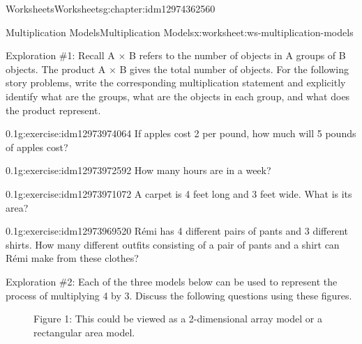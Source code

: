 \documentclass[twoside,11pt,]{book}
\begin{document}
\begin{chapterptx}{Worksheets}{}{Worksheets}{}{}{g:chapter:idm12974362560}
%
\begin{worksheet-section-numberless}{Multiplication Models}{}{Multiplication Models}{}{}{x:worksheet:ws-multiplication-models}
\begin{introduction}{}%
Exploration \#1: Recall A \(\times \) B refers to the number of objects in A groups of B objects.  The product A \(\times \) B gives the total number of objects.  For the following story problems, write the corresponding multiplication statement and explicitly identify what are the groups, what are the objects in each group, and what does the product represent.%
\end{introduction}%
\begin{divisionexercise}{1}{}{0.1}{g:exercise:idm12973974064}%
If apples cost \textdollar{}2 per pound, how much will 5 pounds of apples cost?%
\end{divisionexercise}%
\begin{divisionexercise}{2}{}{0.1}{g:exercise:idm12973972592}%
How many hours are in a week?%
\end{divisionexercise}%
\begin{divisionexercise}{3}{}{0.1}{g:exercise:idm12973971072}%
A carpet is 4 feet long and 3 feet wide. What is its area?%
\end{divisionexercise}%
\begin{divisionexercise}{4}{}{0.1}{g:exercise:idm12973969520}%
Rémi has 4 different pairs of pants and 3 different shirts. How many different outfits consisting of a pair of pants and a shirt can Rémi make from these clothes?%
\end{divisionexercise}%
\clearpage
\begin{introduction}{}%
Exploration \#2: Each of the three models below can be used to represent the process of multiplying 4 by 3.  Discuss the following questions using these figures.%
%
\begin{description}
\item[{}]Figure 1: This could be viewed as a 2-dimensional array model or a rectangular area model. \begin{sidebyside}{1}{0.45}{0.45}{0}%
\begin{sbspanel}{0.1}%

\end{sbspanel}
\end{sidebyside}
\end{description}
\end{introduction}
\end{worksheet-section-numberless}
\end{chapterptx}
\end{document}
